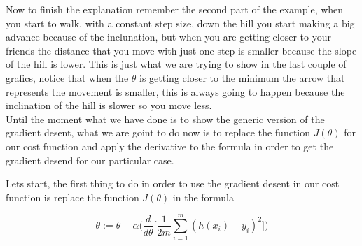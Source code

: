 \documentclass[12pt,journal]{IEEEtran}
\begin{document}

    \newpage

    Now to finish the explanation remember the second part of the example, when
    you start to walk, with a constant step size, down the hill you start
    making a big advance because of the inclunation, but when you are getting
    closer to your friends the distance that you move with just one step is
    smaller because the slope of the hill is lower. This is just what we are
    trying to show in the last couple of grafics, notice that when the $\theta$
    is getting closer to the minimum the arrow that represents the movement is
    smaller, this is always going to happen because the inclination of the hill
    is slower so you move less.\\

    Until the moment what we have done is to show the generic version of the
    gradient desent, what we are goint to do now is to replace the function
    $J(\theta)$ for our cost function and apply the derivative to the formula
    in order to get the gradient desend for our particular case.

    Lets start, the first thing to do in order to use the gradient desent in our
    cost function is replace the function $J(\theta)$ in the formula

    \begin{equation}
        \theta := \theta - \alpha
            \Bigg(
                \frac{d}{d \theta}
                    \Bigg[
                        \frac{1}{2m} \sum_{i=1}^{m} ( h(x_i) - y_i )^2
                    \Bigg]
            \Bigg)
    \end{equation}
\end{document}
